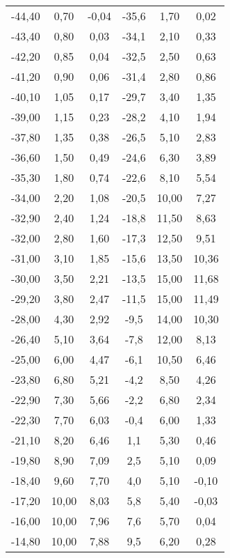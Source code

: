 \begin{table}[htp]
\begin{center}
\begin{tabular}{cccccc}
			-44,40 & 0,70 & -0,04 & -35,6 & 1,70 & 0,02\\
			-43,40 & 0,80 & 0,03 & -34,1 & 2,10 & 0,33\\
			-42,20 & 0,85 & 0,04 & -32,5 & 2,50 & 0,63\\
			-41,20 & 0,90 & 0,06 & -31,4 & 2,80 & 0,86\\
			-40,10 & 1,05 & 0,17 & -29,7 & 3,40 & 1,35\\
			-39,00 & 1,15 & 0,23 & -28,2 & 4,10 & 1,94\\
			-37,80 & 1,35 & 0,38 & -26,5 & 5,10 & 2,83\\
			-36,60 & 1,50 & 0,49 & -24,6 & 6,30 & 3,89\\
			-35,30 & 1,80 & 0,74 & -22,6 & 8,10 & 5,54\\
			-34,00 & 2,20 & 1,08 & -20,5 & 10,00 & 7,27\\
			-32,90 & 2,40 & 1,24 & -18,8 & 11,50 & 8,63\\
			-32,00 & 2,80 & 1,60 & -17,3 & 12,50 & 9,51\\
			-31,00 & 3,10 & 1,85 & -15,6 & 13,50 & 10,36\\
			-30,00 & 3,50 & 2,21 & -13,5 & 15,00 & 11,68\\
			-29,20 & 3,80 & 2,47 & -11,5 & 15,00 & 11,49\\
			-28,00 & 4,30 & 2,92 & -9,5 & 14,00 & 10,30\\
			-26,40 & 5,10 & 3,64 & -7,8 & 12,00 & 8,13\\
			-25,00 & 6,00 & 4,47 & -6,1 & 10,50 & 6,46\\
			-23,80 & 6,80 & 5,21 & -4,2 & 8,50 & 4,26\\
			-22,90 & 7,30 & 5,66 & -2,2 & 6,80 & 2,34\\
			-22,30 & 7,70 & 6,03 & -0,4 & 6,00 & 1,33\\
			-21,10 & 8,20 & 6,46 & 1,1 & 5,30 & 0,46\\
			-19,80 & 8,90 & 7,09 & 2,5 & 5,10 & 0,09\\
			-18,40 & 9,60 & 7,70 & 4,0 & 5,10 & -0,10\\
			-17,20 & 10,00 & 8,03 & 5,8 & 5,40 & -0,03\\
			-16,00 & 10,00 & 7,96 & 7,6 & 5,70 & 0,04\\
			-14,80 & 10,00 & 7,88 & 9,5 & 6,20 & 0,28\\
      \bottomrule
      \end{tabular}
    \end{center}
  \end{table}
